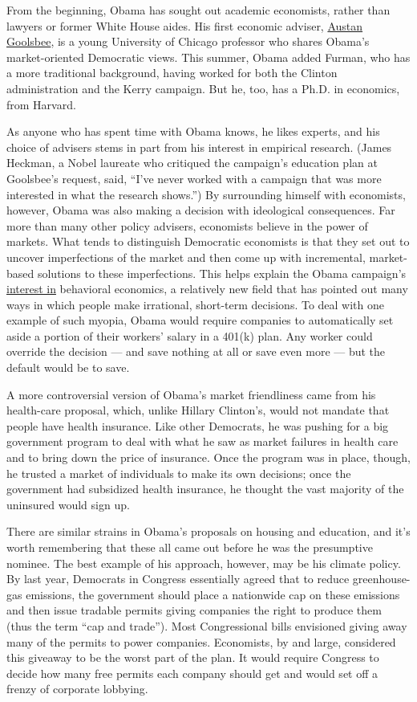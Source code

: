From the beginning, Obama has sought out academic economists, rather
than lawyers or former White House aides. His first economic adviser,
\href{http://faculty.chicagogsb.edu/austan.goolsbee/website/}{Austan
Goolsbee}, is a young University of Chicago professor who shares Obama's
market-oriented Democratic views. This summer, Obama added Furman, who
has a more traditional background, having worked for both the Clinton
administration and the Kerry campaign. But he, too, has a Ph.D. in
economics, from Harvard.

As anyone who has spent time with Obama knows, he likes experts, and his
choice of advisers stems in part from his interest in empirical
research. (James Heckman, a Nobel laureate who critiqued the campaign's
education plan at Goolsbee's request, said, ``I've never worked with a
campaign that was more interested in what the research shows.'') By
surrounding himself with economists, however, Obama was also making a
decision with ideological consequences. Far more than many other policy
advisers, economists believe in the power of markets. What tends to
distinguish Democratic economists is that they set out to uncover
imperfections of the market and then come up with incremental,
market-based solutions to these imperfections. This helps explain the
Obama campaign's
\href{http://www.nytimes.com/2008/01/02/business/02leonhardt.html}{interest
in} behavioral economics, a relatively new field that has pointed out
many ways in which people make irrational, short-term decisions. To deal
with one example of such myopia, Obama would require companies to
automatically set aside a portion of their workers' salary in a 401(k)
plan. Any worker could override the decision --- and save nothing at all
or save even more --- but the default would be to save.

A more controversial version of Obama's market friendliness came from
his health-care proposal, which, unlike Hillary Clinton's, would not
mandate that people have health insurance. Like other Democrats, he was
pushing for a big government program to deal with what he saw as market
failures in health care and to bring down the price of insurance. Once
the program was in place, though, he trusted a market of individuals to
make its own decisions; once the government had subsidized health
insurance, he thought the vast majority of the uninsured would sign up.

There are similar strains in Obama's proposals on housing and education,
and it's worth remembering that these all came out before he was the
presumptive nominee. The best example of his approach, however, may be
his climate policy. By last year, Democrats in Congress essentially
agreed that to reduce greenhouse-gas emissions, the government should
place a nationwide cap on these emissions and then issue tradable
permits giving companies the right to produce them (thus the term ``cap
and trade''). Most Congressional bills envisioned giving away many of
the permits to power companies. Economists, by and large, considered
this giveaway to be the worst part of the plan. It would require
Congress to decide how many free permits each company should get and
would set off a frenzy of corporate lobbying.

